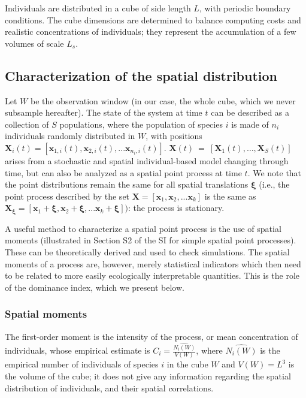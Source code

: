 \documentclass[12pt,english]{article}
\newcommand{\bx}{\boldsymbol{x}}
\newcommand{\bxi}{\boldsymbol{\xi} }
\begin{document}
Individuals are distributed in a cube of side length $L$, with periodic
boundary conditions. The cube dimensions are determined to balance
computing costs and realistic concentrations of individuals; they
represent the accumulation of a few volumes of scale $L_{s}$.

\subsection*{Characterization of the spatial distribution}

Let $W$ be the observation window (in our case, the whole cube, which
we never subsample hereafter). The state of the system at time $t$
can be described as a collection of $S$ populations, where the population
of species $i$ is made of $n_{i}$ individuals randomly distributed
in $W$, with positions $\boldsymbol{X}_{i}(t)=[\bx_{1,i}(t),\bx_{2,i}(t),...\bx_{n_{i},i}(t)]$.
$\boldsymbol{X}(t)~=~[\boldsymbol{X}_{1}(t),\ldots,\boldsymbol{X}_{S}(t)]$
arises from a stochastic and spatial individual-based model changing
through time, but can also be analyzed as a spatial point process
at time $t$. We note that the point distributions remain the same
for all spatial translations $\bxi$ (i.e., the point process described
by the set $\boldsymbol{X}=[\bx_{1},\bx_{2},...\bx_{k}]$ is the same
as $\boldsymbol{X_{\xi}}=[\bx_{1}+\bxi,\bx_{2}+\bxi,...\bx_{k}+\bxi])$:
the process is stationary.

A useful method to characterize a spatial point process is the use
of spatial moments (illustrated in Section S2 of the SI for simple
spatial point processes). These can be theoretically derived and used
to check simulations. The spatial moments of a process are, however,
merely statistical indicators which then need to be related to more
easily ecologically interpretable quantities. This is the role of
the dominance index, which we present below.

\subsubsection*{Spatial moments}

The first-order moment is the intensity of the process, or mean concentration
of individuals, whose empirical estimate is $C_{i}=\frac{\widehat{N_{i}(W)}}{V(W)}$,
where $\widehat{N_{i}(W)}$ is the empirical number of individuals
of species $i$ in the cube $W$ and $V(W)=L^{3}$ is the volume of
the cube; it does not give any information regarding the spatial distribution
of individuals, and their spatial correlations.
\end{document}
